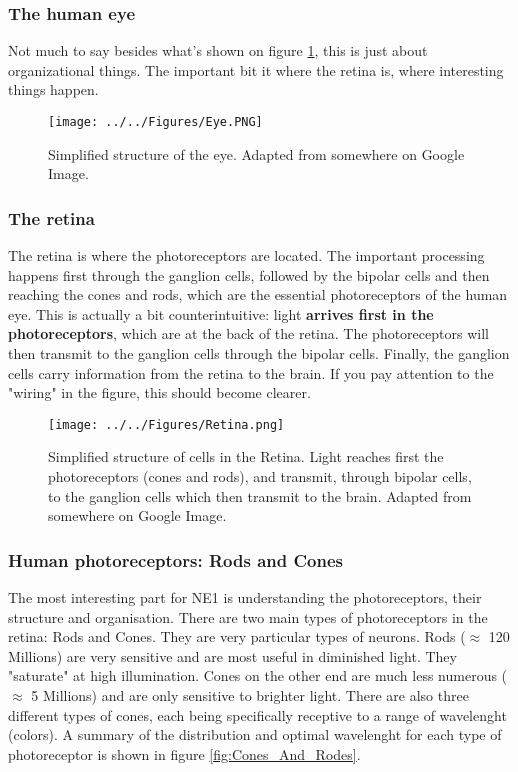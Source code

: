 \subsubsection{The human eye}

Not much to say besides what's shown on figure \ref{fig:Eye}, this is just about organizational things. The important bit it where the retina is, where interesting things happen.  

\begin{figure}[H]
    \centering
    \texttt{[image: ../../Figures/Eye.PNG]}
    \caption{Simplified structure of the eye. Adapted from somewhere on Google Image.}
    \label{fig:Eye}
\end{figure}

\subsubsection{The retina}

The retina is where the photoreceptors are located. The important processing happens first through the ganglion cells, followed by the bipolar cells and then reaching the cones and rods, which are the essential photoreceptors of the human eye. This is actually a bit counterintuitive: light \textbf{arrives first in the photoreceptors}, which are at the back of the retina. The photoreceptors will then transmit to the ganglion cells through the bipolar cells. Finally, the ganglion cells carry information from the retina to the brain. If you pay attention to the "wiring" in the figure, this should become clearer. 

\begin{figure}[H]
    \centering
    \texttt{[image: ../../Figures/Retina.png]}
    \caption{Simplified structure of cells in the Retina. Light reaches first the photoreceptors (cones and rods), and transmit, through bipolar cells, to the ganglion cells which then transmit to the brain. Adapted from somewhere on Google Image.}
    \label{fig:Retina}
\end{figure}

\subsubsection{Human photoreceptors: Rods and Cones}

The most interesting part for NE1 is understanding the photoreceptors, their structure and organisation. There are two main types of photoreceptors in the retina: Rods and Cones. They are very particular types of neurons. Rods ($\approx$ 120 Millions) are very sensitive and are most useful in diminished light. They "saturate" at high illumination. Cones on the other end are much less numerous ($\approx$ 5 Millions) and are only sensitive to brighter light. There are also three different types of cones, each being specifically receptive to a range of wavelenght (colors). A summary of the distribution and optimal wavelenght for each type of photoreceptor is shown in figure \ref{fig:Cones_And_Rodes}.

